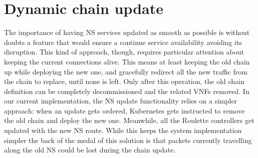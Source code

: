 \section{Dynamic chain update}

The importance of having NS services updated as smooth as possible is without
doubts a feature that would ensure a continue service availability avoiding its
disruption. This kind of approach, though, requires particular attention about
keeping the current connections alive. This means at least keeping the old chain
up while deploying the new one, and gracefully redirect all the new traffic from
the chain to replace, until none is left. Only after this operation, the old
chain definition can be completely decommissioned and the related VNFs removed.
In our current implementation, the NS update functionality relies on a simpler
approach: when an update gets ordered, Kubernetes gets instructed to remove the
old chain and deploy the new one. Meanwhile, all the Roulette controllers get
updated with the new NS route. While this keeps the system implementation
simpler the back of the medal of this solution is that packets currently
travelling along the old NS could be lost during the chain update.
